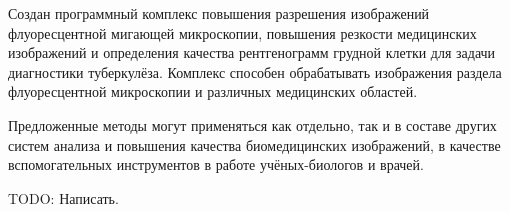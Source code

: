 {\influence}

Создан программный комплекс повышения разрешения изображений флуоресцентной мигающей микроскопии, повышения резкости медицинских изображений и определения качества рентгенограмм грудной клетки для задачи диагностики туберкулёза. Комплекс способен обрабатывать изображения раздела флуоресцентной микроскопии и различных медицинских областей.

Предложенные методы могут применяться как отдельно, так и в составе других систем анализа и повышения качества биомедицинских изображений, в качестве вспомогательных инструментов в работе учёных-биологов и врачей.

{\progress}
TODO: Написать.
%
%


